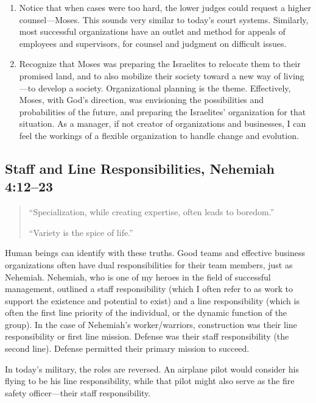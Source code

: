 \documentclass[12pt]{memoir}
\begin{document}
\begin{enumerate}
\item Notice that when cases were too hard, the lower judges could request a higher counsel---Moses.
This sounds very similar to today's court systems.
Similarly, most successful organizations have an outlet and method for appeals of employees and supervisors, for counsel and judgment on difficult issues. 

\item Recognize that Moses was preparing the Israelites to relocate them
to their promised land, and to also mobilize their society toward
a new way of living---to develop a society. Organizational planning
is the theme. Effectively, Moses, with God's direction, was envisioning
the possibilities and probabilities of the future, and preparing the
Israelites' organization for that situation. As a manager, if not
creator of organizations and businesses, I can feel the workings
of a flexible organization to handle change and evolution. 
\end{enumerate}

\subsection[Staff and Line Responsibilities]{Staff and Line Responsibilities, Nehemiah 4:12--23}

\begin{quote}
``Specialization, while creating expertise, often leads to boredom.''

``Variety is the spice of life.'' 
\end{quote}

Human beings can identify with these truths. Good teams and effective business organizations often have dual responsibilities for
their team members, just as Nehemiah. Nehemiah, who is one of my heroes
in the field of successful management, outlined a staff responsibility (which I often refer to as work to support the existence and potential to exist) and a line responsibility (which is often the first line priority
of the individual, or the dynamic function of the group). In the case of Nehemiah's worker\slash{}warriors, construction was their line responsibility
or first line mission. Defense was their staff responsibility (the second line). Defense permitted their primary mission to succeed.

In today's military, the roles are reversed. An airplane pilot would consider his flying to be his line responsibility, while that pilot might also serve as the fire safety officer---their staff responsibility.
\end{document}
